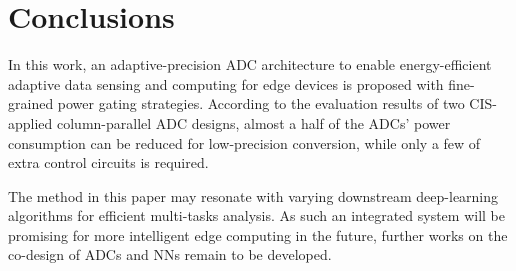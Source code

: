 \section{Conclusions}\label{conclusion}

In this work, an adaptive-precision ADC architecture to enable energy-efficient adaptive data sensing and computing for edge devices is proposed with fine-grained power gating strategies.
According to the evaluation results of two CIS-applied column-parallel ADC designs, almost a half of the ADCs’ power consumption can be reduced for low-precision conversion, 
while only a few of extra control circuits is required.

The method in this paper may resonate with varying downstream deep-learning algorithms for efficient multi-tasks analysis. 
As such an integrated system will be promising for more intelligent edge computing in the future, further works on the co-design of ADCs and NNs remain to be developed.